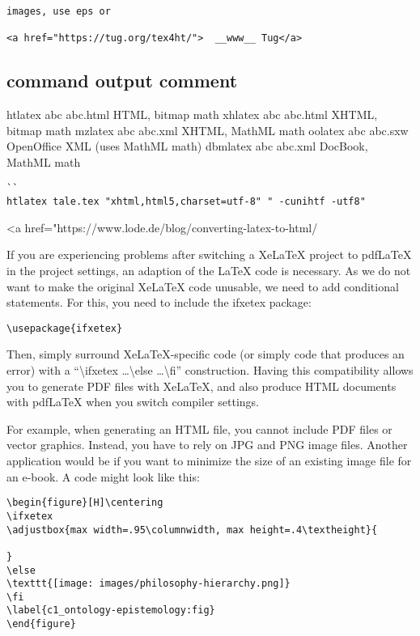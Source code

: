 \documentclass[
]{article}
\begin{document}
\begin{verbatim}
images, use eps or

<a href="https://tug.org/tex4ht/">  __www__ Tug</a>

\end{verbatim}

\subsection{command output comment}

htlatex abc abc.html HTML, bitmap math xhlatex abc abc.html XHTML,
bitmap math mzlatex abc abc.xml XHTML, MathML math oolatex abc abc.sxw
OpenOffice XML (uses MathML math) dbmlatex abc abc.xml DocBook, MathML
math

\begin{verbatim}
``
htlatex tale.tex "xhtml,html5,charset=utf-8" " -cunihtf -utf8"
\end{verbatim}

\textless a href="https://www.lode.de/blog/converting-latex-to-html/

If you are experiencing problems after switching a XeLaTeX project to
pdfLaTeX in the project settings, an adaption of the LaTeX code is
necessary. As we do not want to make the original XeLaTeX code unusable,
we need to add conditional statements. For this, you need to include the
ifxetex package:

\begin{verbatim}
\usepackage{ifxetex}
\end{verbatim}

Then, simply surround XeLaTeX-specific code (or simply code that
produces an error) with a ``\textbackslash ifxetex
\ldots\textbackslash else \ldots\textbackslash fi'' construction. Having
this compatibility allows you to generate PDF files with XeLaTeX, and
also produce HTML documents with pdfLaTeX when you switch compiler
settings.

For example, when generating an HTML file, you cannot include PDF files
or vector graphics. Instead, you have to rely on JPG and PNG image
files. Another application would be if you want to minimize the size of
an existing image file for an e-book. A code might look like this:

\begin{verbatim}
\begin{figure}[H]\centering 
\ifxetex 
\adjustbox{max width=.95\columnwidth, max height=.4\textheight}{ 
 
} 
\else 
\texttt{[image: images/philosophy-hierarchy.png]} 
\fi 
\label{c1_ontology-epistemology:fig} 
\end{figure}
\end{verbatim}
\end{document}
